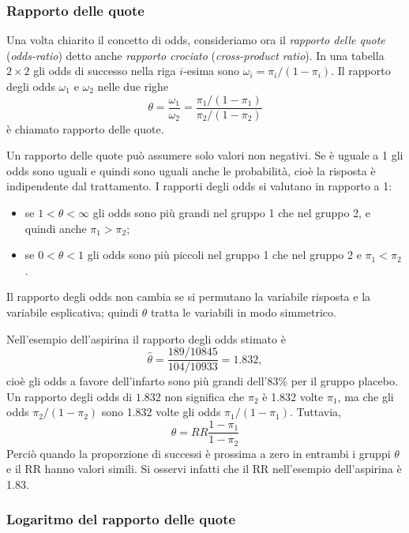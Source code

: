 \subsubsection{Rapporto delle quote}

Una volta chiarito il concetto di odds, consideriamo ora il \emph{rapporto delle quote} (\emph{odds-ratio}) detto anche \emph{rapporto crociato} (\emph{cross-product ratio}).
In una tabella $2 \times 2$ gli odds di successo nella riga $i$-esima sono $\omega_i = \pi_i / (1-\pi_i)$.
Il rapporto degli odds $\omega_1$ e $\omega_2$ nelle due righe
    \[
     \theta = \frac{\omega_1}{\omega_2}=\frac{\pi_1 / (1-\pi_1)}{\pi_2 / (1-\pi_2)}
    \]
è chiamato rapporto delle quote.

Un rapporto delle quote può assumere solo valori non negativi.
Se è uguale a 1 gli odds sono uguali e quindi sono uguali anche le probabilità, cioè la risposta è indipendente dal trattamento. 
I rapporti degli odds si valutano in rapporto a 1:
\begin{itemize}
    \item se $1 < \theta < \infty$ gli odds sono più grandi nel gruppo 1
che nel gruppo 2, e quindi anche $\pi_1 > \pi_2$;
    \item se $0 <  \theta
< 1$ gli odds sono più piccoli nel gruppo 1 che nel gruppo 2 e
$\pi_1 < \pi_2$.
\end{itemize}
Il rapporto degli odds non cambia se si permutano la variabile risposta e la variabile esplicativa; quindi $\theta$ tratta le variabili in modo simmetrico.

\begin{exmp}
Nell'esempio dell'aspirina il rapporto degli odds stimato è
\[
\hat{\theta} = \frac{189/10845}{104/10933}= 1.832,
\]
cioè gli odds a favore dell'infarto sono più grandi dell'83\% per il gruppo placebo.
Un rapporto degli odds di $1.832$ non significa che $\pi_2$ è 1.832 volte $\pi_1$, ma che gli odds $\pi_2/(1 - \pi_2)$ sono 1.832 volte gli odds $\pi_1/(1 - \pi_1)$.
Tuttavia,
\[
 \theta = RR \frac{1-\pi_1}{1-\pi_2}
\]
Perciò quando la proporzione di successi è prossima a zero in entrambi i gruppi $\theta$ e il RR hanno valori simili. 
Si osservi infatti che il RR nell'esempio dell'aspirina è 1.83.
\end{exmp}


\subsubsection{Logaritmo del rapporto delle quote}

